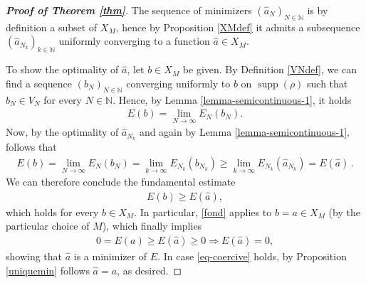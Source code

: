 \documentclass[A4paper,11pt]{article}
\theoremstyle{definition}
\newcommand{\N}{\mathbb{N}}
\DeclareMathOperator{\supp}{supp}
\begin{document}
\begin{proof}[\normalfont\bf Proof of Theorem \ref{thm}]
	The sequence of minimizers $(\widehat a_N)_{N \in \N}$ is by definition a subset of $X_M$, hence by Proposition \ref{XMdef} it admits a subsequence $(\widehat a_{N_k})_{k \in \N}$ uniformly converging to a function $\widehat a \in X_M$.
	
	To show the optimality of $\widehat a$, let $b\in X_M$ be given. By Definition \ref{VNdef}, we can find a sequence $(b_N)_{N \in \N}$ converging uniformly to $b$ on $\supp(\rho)$ such that $b_N\in V_N$ for every $N\in \N$. Hence, by Lemma \ref{lemma-semicontinuous-1}, it holds
	\begin{align*}
		E(b)=\lim_{N\rightarrow\infty}E_{N}(b_{N}).
	\end{align*}
	Now, by the optimality of $\widehat a_{N_k}$ and again by Lemma \ref{lemma-semicontinuous-1}, follows that
	\begin{align*}
		E(b)=\lim_{N\rightarrow\infty}E_N(b_N)
			= \lim_{k \rightarrow\infty}E_{N_k}(b_{N_k})
			\geq\lim_{k \rightarrow\infty}E_{N_k}(\widehat a_{N_k})
			= E(\widehat a)\,.
	\end{align*}
	We can therefore conclude the fundamental estimate
	\begin{align}\label{fond}
		E(b)\geq E(\widehat a),
	\end{align}
	which holds for every $b \in X_M$. In particular, \eqref{fond} applies to $b=a\in X_M$ (by the particular choice of $M$), which finally implies
	\begin{align*}
		0=E(a)\geq E(\widehat a)\geq 0\Longrightarrow E(\widehat a)=0,
	\end{align*}
	showing that $\widehat a$ is a minimizer of $E$. In case \eqref{eq-coercive} holds, by Proposition \ref{uniquemin} follows $\widehat a=a$, as desired.
\end{proof}
\end{document}

